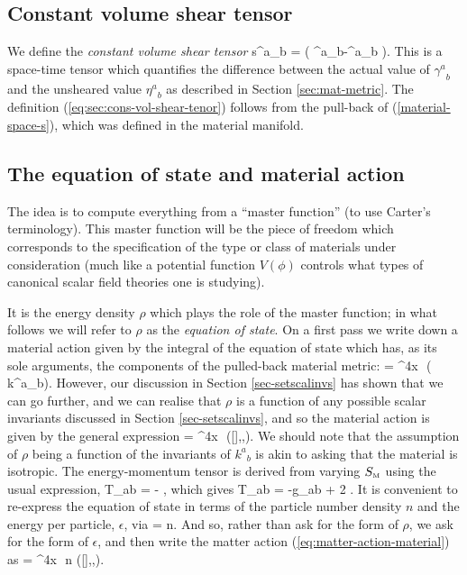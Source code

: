 \subsection{Constant volume shear tensor}
We define the \textit{constant  volume shear tensor}
\bea
\label{eq:sec:cons-vol-shear-tenor}
{s^a}_b = \left( {\gamma^a}_b-{\eta^a}_b \right).
\eea
This is a space-time tensor which quantifies the difference between the actual value of ${\gamma^a}_b$ and the unsheared value ${\eta^a}_b$ as described in Section \ref{sec:mat-metric}. The definition (\ref{eq:sec:cons-vol-shear-tenor}) follows from the pull-back of (\ref{material-space-s}), which was defined in the material manifold.
\subsection{The equation of state and material action}
\label{sec:eos-introd}
The idea is to compute everything from a ``master function'' (to use Carter's terminology). This master function will be the piece of freedom which corresponds to the specification of the type or class of materials under consideration (much like a potential function $V(\phi)$ controls what types of canonical scalar field theories one is studying). 

It is  the energy density $\rho$  which plays the role of the master function; in what follows we will refer to $\rho$ as the \textit{equation of state}. On a first pass  we write down a material action given by the integral of the equation of state which has, as its sole arguments, the components of the pulled-back material metric:
\bea
\label{material-action-k-no-invaraints-1}
 =  \int \dd^4x\,\, \rho\left( {k^a}_b\right).
\eea 
However, our discussion in Section \ref{sec-setscalinvs} has shown that we can go further, and we can realise that $\rho$ is a  function of any possible scalar invariants discussed in Section \ref{sec-setscalinvs}, and so the material action is given by the general expression
\bea
\label{eq:matter-action-material}
 = \int \dd^4x\,\, \rho\left([],,\right).
\eea
We should note that the assumption of $\rho$ being a function of the invariants of ${k^a}_b$ is akin to asking that the material is isotropic. 
The energy-momentum tensor is   derived from varying ${S}_{\scriptscriptstyle{\textrm{M}}}$ using the usual expression,
\bea
T_{ab} = - ,
\eea
which gives
\bea
\label{eq:sec:EMT-defn}
T_{ab} = -\rho g_{ab} + 2 .
\eea
It is convenient to re-express the equation of state in terms of the particle number density $n$ and the energy per particle, $\epsilon$, via
\bea
\label{eq:decomp_n_rho_ep}
\rho = n\epsilon.
\eea
And so, rather than ask for the form of $\rho$, we ask for the form of $\epsilon$, and then write the matter action (\ref{eq:matter-action-material}) as
\bea
{} = \int \dd^4x\,\, n \epsilon\left([],,\right).
\eea


